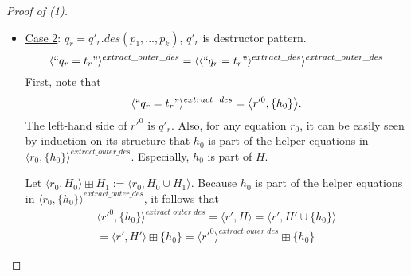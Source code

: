 \documentclass[11pt]{article} %
\begin{document}
\begin{proof}[Proof of (1)]
\begin{enumerate}
\begin{itemize}
\begin{enumerate}
\item unless $H = \emptyset$, there is an equation $`` q_h = t_h "$ in $H$ with $q_r \sim q_h$ and $t_r \sim t_h$

Proof: Trivially true, since $H = \emptyset$.

\item $q_{r'} \sim t_{r'}$ or ($r = r'$ and $H = \emptyset$)

Proof: By the definition of $extract\_outer\_des$ (as given above) it is $r = r'$ and $H = \emptyset$.

\item the set of rules in $\big\langle r', H \big\rangle$ is deterministic (TODO: define analogously to programs)

Proof: Clear since there is only one equation.

\item for every equation $`` q_h = t_h "$ in $H$: $q_h \sim q^0_r$ for some sub-copattern $q^0_r$ of $q_r$

Proof: Trivially true, because $H = \emptyset$.

\end{enumerate}

\item \underline{Case 2}: $q_r = q'_r.des(p_1, ..., p_k)$, $q'_r$ is destructor pattern.
\begin{equation*}
\langle `` q_r = t_r " \rangle^{extract\_outer\_des} = \langle \langle `` q_r = t_r " \rangle^{extract\_des} \rangle^{extract\_outer\_des}
\end{equation*}
First, note that
\begin{equation*}
\langle `` q_r = t_r " \rangle^{extract\_des} = \big\langle r'^0, \{h_0\} \big\rangle.
\end{equation*}
The left-hand side of $r'^0$ is $q'_r$. Also, for any equation $r_0$, it can be easily seen by induction on its structure that $h_0$ is part of the helper equations in $\big\langle r_0, \{h_0\} \big\rangle^{extract\_outer\_des}$. Especially, $h_0$ is part of $H$.

Let $\big\langle r_0, H_0 \big\rangle \boxplus H_1 := \big\langle r_0, H_0 \cup H_1 \big\rangle$. Because $h_0$ is part of the helper equations in $\langle r_0, \{h_0\} \rangle^{extract\_outer\_des}$, it follows that
\begin{multline*}
\langle r'^0, \{h_0\} \rangle^{extract\_outer\_des} = \big\langle r', H \big\rangle = \big\langle r', H' \cup \{h_0\} \big\rangle \\
= \big\langle r', H' \big\rangle \boxplus \{h_0\} = \langle r'^0 \rangle^{extract\_outer\_des} \boxplus \{h_0\}
\end{multline*}


\end{itemize}
\end{enumerate}
\end{proof}
\end{document}
